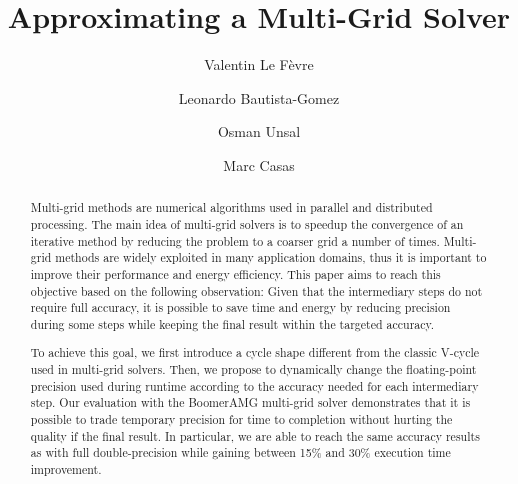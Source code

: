 \documentclass[sigconf]{acmart}
\title{Approximating a Multi-Grid Solver}
\author{Valentin Le F\`{e}vre}
\affiliation{\'{E}cole Normale Supérieure de Lyon}
\author{Leonardo Bautista-Gomez}
\affiliation{Barcelona Supercomputing Center (BSC)}
\author{Osman Unsal}
\affiliation{Barcelona Supercomputing Center (BSC)}
\author{Marc Casas}
\affiliation{Barcelona Supercomputing Center (BSC)}
\begin{document}
\maketitle
\begin{abstract}

    Multi-grid methods are numerical algorithms used in parallel and
    distributed processing. The main idea of multi-grid solvers is to speedup
    the convergence of an iterative method by reducing the problem to a coarser
    grid a number of times. Multi-grid methods are widely exploited in many
    application domains, thus it is important to improve  their performance and
    energy efficiency. This paper aims to reach this objective based on the
    following observation: Given that the intermediary steps do not require
    full accuracy, it is possible to save time and energy by reducing precision
    during some steps while keeping the final result within the targeted
    accuracy.

    To achieve this goal, we first introduce a cycle shape different from
    the classic V-cycle used in multi-grid solvers.  Then, we propose to
    dynamically change the floating-point precision used during runtime
    according to the accuracy needed for each intermediary step. Our evaluation
    with the BoomerAMG multi-grid solver demonstrates that it is possible to
    trade temporary precision for time to completion without hurting the
    quality if the final result.  In particular, we are able to reach the same
    accuracy results as with full double-precision while gaining between 15\%
    and 30\% execution time improvement.

\end{abstract}



















\end{document}

